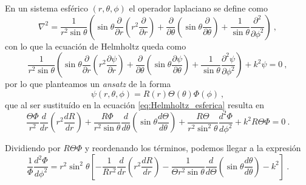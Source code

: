 En un sistema esférico $(r, \theta,\phi)$ el operador laplaciano se define como
\begin{equation}
    \nabla^2 = \frac{1}{r^2 \sin\theta} \left( \sin\theta \frac{\partial}{\partial r}\left( r^2 \frac{\partial}{\partial r} \right) + \frac{\partial}{\partial \theta} \left( \sin\theta \frac{\partial}{\partial \theta} \right) + \frac{1}{\sin\theta} \frac{\partial^2}{\partial \phi^2} \right) \ ,
\end{equation}
con lo que la ecuación de Helmholtz queda como
\begin{equation} \label{eq:Helmholtz_esferica}
    \frac{1}{r^2 \sin\theta} \left( \sin\theta \frac{\partial}{\partial r}\left( r^2 \frac{\partial \psi}{\partial r} \right) + \frac{\partial}{\partial \theta} \left( \sin\theta \frac{\partial \psi}{\partial \theta} \right) + \frac{1}{\sin\theta} \frac{\partial^2 \psi}{\partial \phi^2} \right) + k^2\psi = 0 \ ,
\end{equation}
por lo que planteamos un \emph{ansatz} de la forma
\begin{equation}
    \psi(r,\theta, \phi) = R(r) \Theta(\theta) \Phi(\phi) \ ,
\end{equation}
que al ser sustituído en la ecuación \eqref{eq:Helmholtz_esferica} resulta en
\begin{equation}
    \frac{\Theta \Phi}{r^2} \frac{d}{dr}\left( r^2 \frac{dR}{dr} \right) + \frac{R\Phi}{r^2\sin\theta} \frac{d}{d \theta} \left( \sin\theta \frac{d\Theta}{d \theta} \right) + \frac{R\Theta}{r^2\sin^2\theta} \frac{d^2\Phi}{d \phi^2} + k^2 R \Theta \Phi = 0 \ .
\end{equation}

Dividiendo por $R\Theta\Phi$ y reordenando los términos, podemos llegar a la expresión
\begin{equation}
    \frac{1}{\Phi} \frac{d^2\Phi}{d\phi^2} = r^2\sin^2\theta \left[ -\frac{1}{Rr^2} \frac{d}{dr}\left( r^2 \frac{dR}{dr} \right) - \frac{1}{\Theta r^2\sin\theta} \frac{d}{d\Theta} \left( \sin\theta \frac{d\theta}{d\theta} \right) - k^2 \right] \ .
\end{equation}

